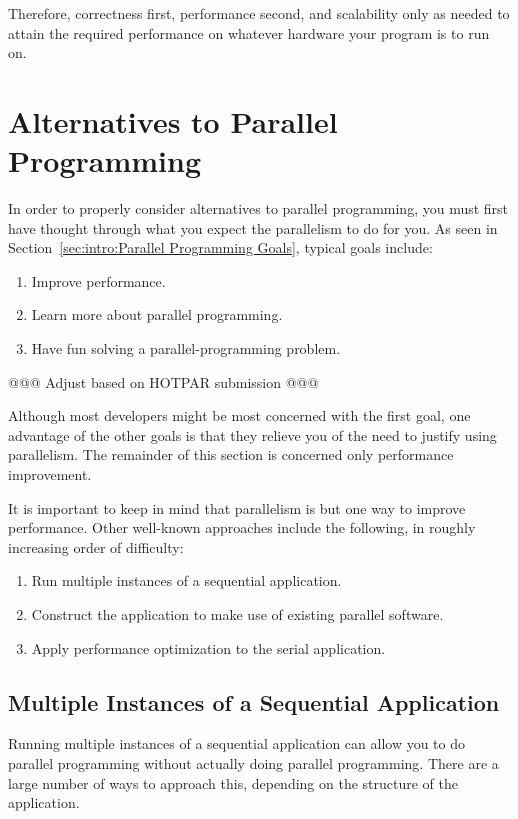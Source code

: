 Therefore, correctness first, performance second,
and scalability only as needed to
attain the required performance on whatever hardware your program
is to run on.

\section{Alternatives to Parallel Programming}
\label{sec:intro:Alternatives to Parallel Programming}

In order to properly consider alternatives to parallel programming,
you must first have thought through what you expect the parallelism
to do for you.
As seen in Section~\ref{sec:intro:Parallel Programming Goals},
typical goals include:

\begin{enumerate}
\item	Improve performance.
\item	Learn more about parallel programming.
\item	Have fun solving a parallel-programming problem.
\end{enumerate}

@@@ Adjust based on HOTPAR submission @@@

Although most developers might be most concerned with the first goal,
one advantage of the other goals is that they relieve you of the need
to justify using parallelism.
The remainder of this section is concerned only performance improvement.

It is important to keep in mind that parallelism is but one way to
improve performance.
Other well-known approaches include the following, in roughly increasing
order of difficulty:

\begin{enumerate}
\item	Run multiple instances of a sequential application.
\item	Construct the application to make use of existing parallel software.
\item	Apply performance optimization to the serial application.
\end{enumerate}

\subsection{Multiple Instances of a Sequential Application}
\label{sec:intro:Multiple Instances of a Sequential Application}

Running multiple instances of a sequential application can allow you
to do parallel programming without actually doing parallel programming.
There are a large number of ways to approach this, depending on the
structure of the application.

